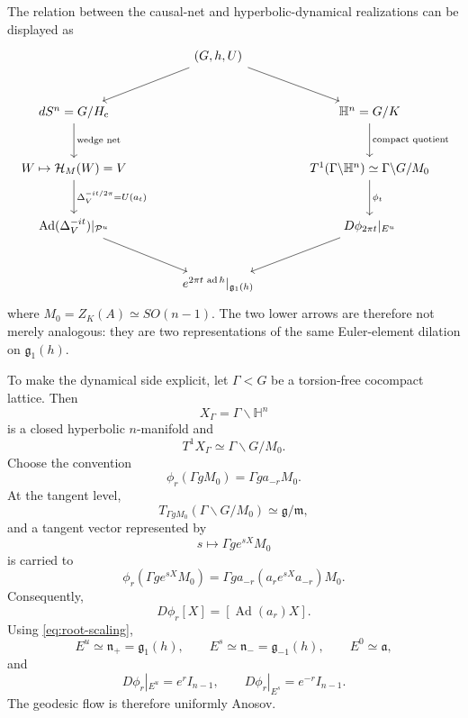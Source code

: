 \documentclass[a4paper,11pt]{article}
\theoremstyle{definition}
\newcommand{\cH}{\mathcal{H}}
\newcommand{\Ad}{\operatorname{Ad}}
\begin{document}
The relation between the causal-net and hyperbolic-dynamical realizations can be displayed
as
\[
\begin{tikzcd}[column sep=large,row sep=large]
& (G,h,U) \arrow[dl] \arrow[dr] & \\
dS^n=G/H_{\rm c} \arrow[d,"\text{wedge net}"]
&&
\mathbb H^n=G/K \arrow[d,"\text{compact quotient}"]\\
W\mapsto \cH_M(W)=V
\arrow[d,"\Delta_V^{-it/2\pi}=U(a_t)"]
&&
T^1(\Gamma\backslash\mathbb H^n)\simeq\Gamma\backslash G/M_0
\arrow[d,"\phi_t"]\\
\Ad(\Delta_V^{-it})|_{\mathcal P^u}
\arrow[dr]
&&
D\phi_{2\pi t}|_{E^u}\arrow[dl]\\
&
e^{2\pi t\,\operatorname{ad}h}|_{\mathfrak g_1(h)}
&
\end{tikzcd}
\]
where \(M_0=Z_K(A)\simeq SO(n-1)\).  The two lower arrows are therefore not merely
analogous: they are two representations of the same Euler-element dilation on
\(\mathfrak g_1(h)\).

To make the dynamical side explicit, let \(\Gamma<G\) be a torsion-free cocompact lattice.
Then
\[
X_\Gamma=\Gamma\backslash\mathbb H^n
\]
is a closed hyperbolic \(n\)-manifold and
\begin{equation}
T^1X_\Gamma
\simeq
\Gamma\backslash G/M_0.
\label{eq:unit-tangent}
\end{equation}
Choose the convention
\begin{equation}
\phi_r(\Gamma gM_0)=\Gamma ga_{-r}M_0.
\label{eq:geodesic-flow}
\end{equation}
At the tangent level,
\[
T_{\Gamma gM_0}(\Gamma\backslash G/M_0)\simeq \mathfrak g/\mathfrak m,
\]
and a tangent vector represented by
\[
s\longmapsto \Gamma ge^{sX}M_0
\]
is carried to
\[
\phi_r(\Gamma ge^{sX}M_0)
=
\Gamma ga_{-r}\left(a_re^{sX}a_{-r}\right)M_0.
\]
Consequently,
\begin{equation}
D\phi_r[X]=[\Ad(a_r)X].
\label{eq:derivative-adjoint}
\end{equation}
Using \eqref{eq:root-scaling},
\begin{equation}
E^u\simeq\mathfrak n_+=\mathfrak g_1(h),\qquad
E^s\simeq\mathfrak n_-=\mathfrak g_{-1}(h),\qquad
E^0\simeq\mathfrak a,
\label{eq:splitting}
\end{equation}
and
\begin{equation}
D\phi_r|_{E^u}=e^r I_{n-1},
\qquad
D\phi_r|_{E^s}=e^{-r}I_{n-1}.
\label{eq:anosov-derivative}
\end{equation}
The geodesic flow is therefore uniformly Anosov.
\end{document}

